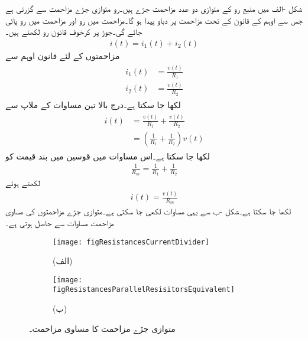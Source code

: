 شکل -الف میں منبع رو  کے متوازی دو عدد مزاحمت جڑے ہیں۔رو  متوازی جڑے مزاحمت سے گزرتی ہے جس سے اوہم کے قانون کے تحت مزاحمت پر دباو  پیدا ہو گا۔مزاحمت  میں رو  اور مزاحمت  میں رو  پائی جائے گی۔جوڑ  پر کرخوف قانون رو لکھتے ہیں۔
\begin{align}\label{مساوات_مزاحمتی_تقسیم_رو_الف}
i(t)=i_1(t)+i_2(t)
\end{align}
مزاحمتوں کے لئے قانون اوہم سے
\begin{gather}
\begin{aligned}\label{مساوات_مزاحمتی_تقسیم_رو_ب}
i_1(t)&=\frac{v(t)}{R_1}\\
i_2(t)&=\frac{v(t)}{R_2}
\end{aligned}
\end{gather}
لکھا جا سکتا ہے۔درج بالا تین مساوات کے ملاپ سے
\begin{gather}
\begin{aligned}\label{مساوات_مزاحمتی_تقسیم_رو_پ}
i(t)&=\frac{v(t)}{R_1}+\frac{v(t)}{R_2}\\
&=\left(\frac{1}{R_1}+\frac{1}{R_2}\right) v(t)
\end{aligned}
\end{gather}
لکھا جا سکتا ہے۔اس مساوات میں قوسین میں بند قیمت کو
\begin{align}\label{مساوات_مزاحمتی_متوازی_مساوی}
\frac{1}{R_m}=\frac{1}{R_1}+\frac{1}{R_2}
\end{align}
لکھتے ہوئے
\begin{align}\label{مساوات_مزاحمتی_دباو_اور_مساوی_مزاحمت_برابر_دباو}
i(t)=\frac{v(t)}{R_m}
\end{align}
لکھا جا سکتا ہے۔شکل -ب سے یہی مساوات لکھی جا سکتی ہے۔متوازی جڑے مزاحمتوں کی مساوی مزاحمت مساوات  سے حاصل ہوتی ہے۔
\begin{figure}
\centering
\begin{subfigure}{0.5\textwidth}
\centering
\texttt{[image: figResistancesCurrentDivider]}
\caption*{(الف)}
\end{subfigure}%
\begin{subfigure}{0.5\textwidth}
\centering
\texttt{[image: figResistancesParallelResisitorsEquivalent]}
\caption*{(ب)}
\end{subfigure}%
\caption{متوازی جڑے مزاحمت کا مساوی مزاحمت۔}
\label{شکل_مزاحمتی_متوازی_جڑے_پرزوں_میں_تقسیم_رو}
\end{figure}

